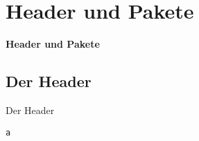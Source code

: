 \section{Header und Pakete}
\begin{frame}[c]
	\begin{center}
		\LARGE \textbf{Header und Pakete}
	\end{center}
\end{frame}
\subsection{Der Header}
\begin{frame}[c]
	\begin{center}
		\large Der Header
	\end{center}
\end{frame}
\begin{frame}[fragile]
	\Ausgabe
	\begin{outputbox}
		
	\end{outputbox}

	\pause\Code
	\begin{lstlisting}
a
	\end{lstlisting}
\end{frame}
